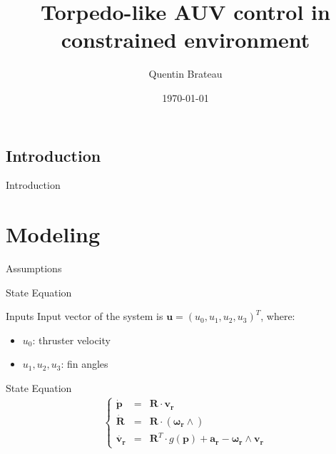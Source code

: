 \documentclass{beamer}
\title{Torpedo-like AUV control in constrained environment}
\date{\today}
\author{Quentin Brateau}
\institute{ENSTA Bretagne}
\begin{document}
    \maketitle

    \subsection{Introduction}

        \begin{frame}{Introduction}
        \end{frame}
    
    \section{Modeling}

        \begin{frame}{Assumptions}
            \begin{minipage}{0.45\textwidth}
                \begin{block}{}
                \end{block}
            \end{minipage}
        \end{frame}


        \begin{frame}{State Equation}
            \centering
            \begin{minipage}{0.7\textwidth}
                \begin{block}{Inputs}
                    \centering
                    Input vector of the system is $\mathbf{u} = (u_0, u_1, u_2, u_3)^T$, where:
                    \begin{itemize}
                        \item $u_0$: thruster velocity \\
                        \item $u_1, u_2, u_3$: fin angles
                    \end{itemize}
                \end{block}
                \begin{block}{State Equation}
                    \begin{eqnarray}
                        \left\{
                            \begin{array}{rcl}
                                \dot{\mathbf{p}} & = & \mathbf{R} \cdot \mathbf{v_r} \\
                                \dot{\mathbf{R}} & = & \mathbf{R} \cdot (\mathbf{\omega_r} \wedge) \\
                                \dot{\mathbf{v_r}} & = & \mathbf{R}^T \cdot g(\mathbf{p}) + \mathbf{a_r} - \mathbf{\omega_r} \wedge \mathbf{v_r}
                            \end{array}
                        \right.
                    \end{eqnarray}
                \end{block}
            \end{minipage}
        \end{frame}
\end{document}
